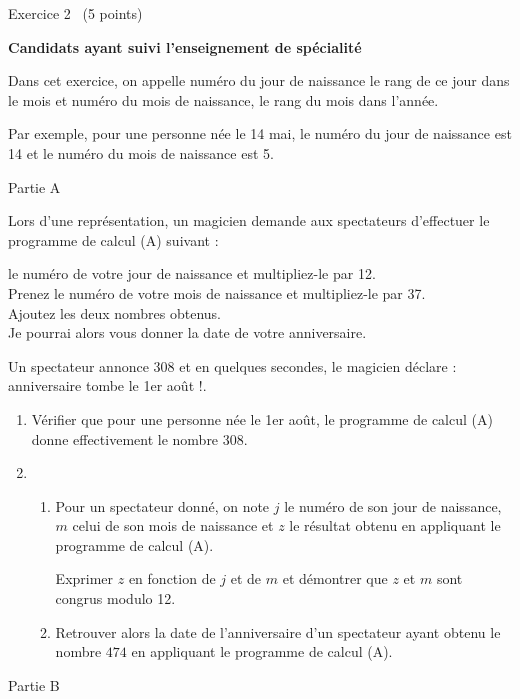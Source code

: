 
%
\begin{h2}Exercice 2  (5 points)\end{h2}
\textbf{Candidats ayant suivi l'enseignement de spécialité}
\par
Dans cet exercice, on appelle numéro du jour de naissance le rang de ce jour dans le mois et numéro du mois de naissance, le rang du mois dans l'année.
\par
Par exemple, pour une personne née le 14 mai, le numéro du jour de naissance est 14 et le numéro du mois de naissance est 5.
\begin{h3}Partie A\end{h3}
Lors d'une représentation, un magicien demande aux spectateurs d'effectuer le programme de calcul (A) suivant :
\par
\ogPrenez le numéro de votre jour de naissance et multipliez-le par 12.
\\ Prenez le numéro de votre mois de naissance et multipliez-le par 37. 
\\Ajoutez les deux nombres obtenus. 
\\Je pourrai alors vous donner la date de votre anniversaire\fg{}.
\par
Un spectateur annonce 308 et en quelques secondes, le magicien déclare : \ogVotre anniversaire tombe le 1er août !\fg{}.
\begin{enumerate}
     \item
     Vérifier que pour une personne née le 1er août, le programme de calcul (A) donne effectivement le nombre $308$.
     \item
     \begin{enumerate}[label=\alph*.]
          \item
          Pour un spectateur donné, on note $j$ le numéro de son jour de naissance, $m$ celui de son mois de naissance et $z$ le résultat obtenu en appliquant le programme de calcul (A).
          \par
          Exprimer $z$ en fonction de $j$ et de $m$ et démontrer que $z$ et $m$ sont congrus modulo 12.
          \item
     Retrouver alors la date de l'anniversaire d'un spectateur ayant obtenu le nombre $474$ en appliquant le programme de calcul (A).\end{enumerate}
\end{enumerate}
\begin{h3}Partie B\end{h3}

